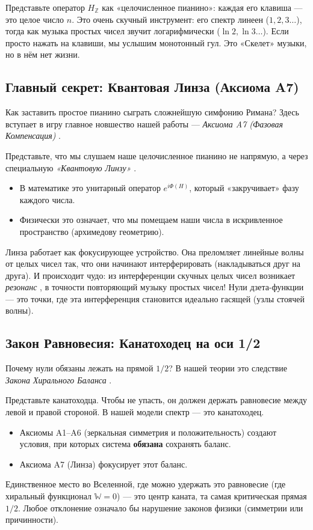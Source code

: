 \documentclass{article}
\numberwithin{equation}{section}
\theoremstyle{plain}
\theoremstyle{definition}
\theoremstyle{remark}
\begin{document}
Представьте оператор $H_{\mathbb{Z}}$ как «целочисленное пианино»: каждая его клавиша — это целое число $n$.
Это очень скучный инструмент: его спектр линеен ($1, 2, 3\dots$), тогда как музыка простых чисел звучит логарифмически ($\ln 2, \ln 3\dots$). Если просто нажать на клавиши, мы услышим монотонный гул. Это «Скелет» музыки, но в нём нет жизни.

\subsection*{Главный секрет: Квантовая Линза (Аксиома A7)}
Как заставить простое пианино сыграть сложнейшую симфонию Римана?
Здесь вступает в игру главное новшество нашей работы — \emph{Аксиома A7 (Фазовая Компенсация)} .

Представьте, что мы слушаем наше целочисленное пианино не напрямую, а через специальную \emph{«Квантовую Линзу»} .
\begin{itemize}
    \item В математике это унитарный оператор $e^{i\Phi(H)}$, который «закручивает» фазу каждого числа.
    \item Физически это означает, что мы помещаем наши числа в искривленное пространство (архимедову геометрию).
\end{itemize}

Линза работает как фокусирующее устройство. Она преломляет линейные волны от целых чисел так, что они начинают интерферировать (накладываться друг на друга). И происходит чудо: из интерференции скучных целых чисел возникает \emph{резонанс} , в точности повторяющий музыку простых чисел! Нули дзета-функции — это точки, где эта интерференция становится идеально гасящей (узлы стоячей волны).

\subsection*{Закон Равновесия: Канатоходец на оси 1/2}
Почему нули обязаны лежать на прямой $1/2$?
В нашей теории это следствие \emph{Закона Хирального Баланса} .

Представьте канатоходца. Чтобы не упасть, он должен держать равновесие между левой и правой стороной.
В нашей модели спектр — это канатоходец.
\begin{itemize}
    \item Аксиомы A1–A6 (зеркальная симметрия и положительность) создают условия, при которых система \textbf{обязана} сохранять баланс.
    \item Аксиома A7 (Линза) фокусирует этот баланс.
\end{itemize}
Единственное место во Вселенной, где можно удержать это равновесие (где хиральный функционал $\mathbb{W} = 0$) — это центр каната, та самая критическая прямая $1/2$. Любое отклонение означало бы нарушение законов физики (симметрии или причинности).
\end{document}

